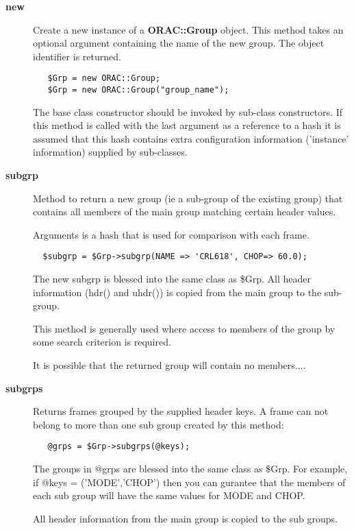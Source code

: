 \begin{description}
\item[\textbf{new}] \mbox{}

Create a new instance of a \textbf{ORAC::Group} object.
This method takes an optional argument containing the
name of the new group. The object identifier is returned.

\begin{verbatim}
   $Grp = new ORAC::Group;
   $Grp = new ORAC::Group("group_name");
\end{verbatim}


The base class constructor should be invoked by sub-class constructors.
If this method is called with the last argument as a reference to
a hash it is assumed that this hash contains extra configuration
information ('instance' information) supplied by sub-classes.

\item[\textbf{subgrp}] \mbox{}

Method to return a new group (ie a sub-group of the existing
group) that contains all members of the main group matching
certain header values.



Arguments is a hash that is used for comparison with each
frame.

\begin{verbatim}
  $subgrp = $Grp->subgrp(NAME => 'CRL618', CHOP=> 60.0);
\end{verbatim}


The new subgrp is blessed into the same class as \$Grp.
All header information (hdr() and uhdr()) is copied 
from the main group to the sub-group.



This method is generally used where access to members of the
group by some search criterion is required.



It is possible that the returned group will contain no 
members....

\item[\textbf{subgrps}] \mbox{}

Returns frames grouped by the supplied header keys.
A frame can not belong to more than one sub group created by this
method:

\begin{verbatim}
   @grps = $Grp->subgrps(@keys);
\end{verbatim}


The groups in @grps are blessed into the same class as \$Grp.
For example, if @keys = ('MODE','CHOP') then you can gurantee
that the members of each sub group will have the same values
for MODE and CHOP.



All header information from the main group is copied to the
sub groups.

\end{description}
